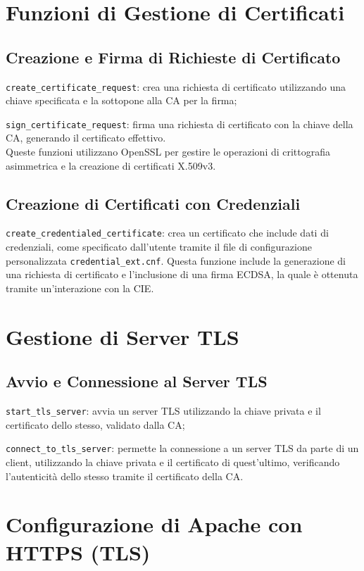     \section{Funzioni di Gestione di Certificati}
        \subsection{Creazione e Firma di Richieste di Certificato}
            \texttt{create\_certificate\_request}: crea una richiesta di certificato utilizzando una chiave specificata e la sottopone alla CA per la firma;

            \texttt{sign\_certificate\_request}: firma una richiesta di certificato con la chiave della CA, generando il certificato effettivo. \\

            \noindent Queste funzioni utilizzano OpenSSL per gestire le operazioni di crittografia asimmetrica e la creazione di certificati X.509v3.

        \subsection{Creazione di Certificati con Credenziali}
            \texttt{create\_credentialed\_certificate}: crea un certificato che include dati di credenziali, come specificato dall'utente tramite il file di configurazione personalizzata \texttt{credential\_ext.cnf}.
            Questa funzione include la generazione di una richiesta di certificato e l'inclusione di una firma ECDSA, la quale è ottenuta tramite un'interazione con la CIE.

    \section{Gestione di Server TLS}
        \subsection{Avvio e Connessione al Server TLS}
            \texttt{start\_tls\_server}: avvia un server TLS utilizzando la chiave privata e il certificato dello stesso, validato dalla CA;

            \texttt{connect\_to\_tls\_server}: permette la connessione a un server TLS da parte di un client, utilizzando la chiave privata e il certificato di quest'ultimo, verificando l'autenticità dello stesso tramite il certificato della CA.

    \section{Configurazione di Apache con HTTPS (TLS)}
